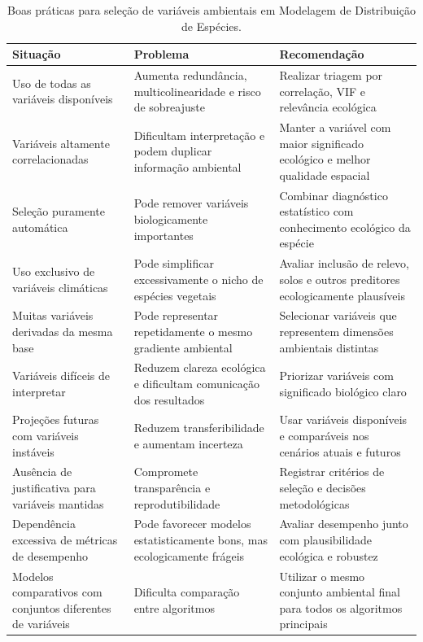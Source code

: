 \begin{table}[H]
	\centering
	\caption{Boas práticas para seleção de variáveis ambientais em Modelagem de Distribuição de Espécies.}
	\label{tab:boas_praticas_variaveis}
	\small
	\begin{tabular}{p{4.0cm}p{5.2cm}p{6.0cm}}
		\toprule
		\textbf{Situação} & \textbf{Problema} & \textbf{Recomendação} \\
		\midrule
		Uso de todas as variáveis disponíveis & Aumenta redundância, multicolinearidade e risco de sobreajuste & Realizar triagem por correlação, VIF e relevância ecológica \\
		Variáveis altamente correlacionadas & Dificultam interpretação e podem duplicar informação ambiental & Manter a variável com maior significado ecológico e melhor qualidade espacial \\
		Seleção puramente automática & Pode remover variáveis biologicamente importantes & Combinar diagnóstico estatístico com conhecimento ecológico da espécie \\
		Uso exclusivo de variáveis climáticas & Pode simplificar excessivamente o nicho de espécies vegetais & Avaliar inclusão de relevo, solos e outros preditores ecologicamente plausíveis \\
		Muitas variáveis derivadas da mesma base & Pode representar repetidamente o mesmo gradiente ambiental & Selecionar variáveis que representem dimensões ambientais distintas \\
		Variáveis difíceis de interpretar & Reduzem clareza ecológica e dificultam comunicação dos resultados & Priorizar variáveis com significado biológico claro \\
		Projeções futuras com variáveis instáveis & Reduzem transferibilidade e aumentam incerteza & Usar variáveis disponíveis e comparáveis nos cenários atuais e futuros \\
		Ausência de justificativa para variáveis mantidas & Compromete transparência e reprodutibilidade & Registrar critérios de seleção e decisões metodológicas \\
		Dependência excessiva de métricas de desempenho & Pode favorecer modelos estatisticamente bons, mas ecologicamente frágeis & Avaliar desempenho junto com plausibilidade ecológica e robustez \\
		Modelos comparativos com conjuntos diferentes de variáveis & Dificulta comparação entre algoritmos & Utilizar o mesmo conjunto ambiental final para todos os algoritmos principais \\
		\bottomrule
	\end{tabular}
\end{table}

